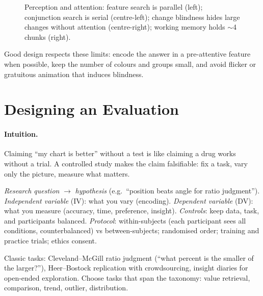 \begin{figure}[h]
\caption{Perception and attention: feature search is parallel (left); conjunction search is serial (centre-left); change blindness hides large changes without attention (centre-right); working memory holds $\sim$4 chunks (right).}
\label{fig:perception-cog}
\end{figure}

Good design respects these limits: encode the answer in a pre-attentive feature when possible, keep the number of colours and groups small, and avoid flicker or gratuitous animation that induces blindness.

\section{Designing an Evaluation}
\label{sec:evaluation-design}
\paragraph{Intuition.} Claiming ``my chart is better'' without a test is like claiming a drug works without a trial. A controlled study makes the claim falsifiable: fix a task, vary only the picture, measure what matters.

\begin{definition}\label{def:study}
\emph{Research question} $\to$ \emph{hypothesis} (e.g.\ ``position beats angle for ratio judgment''). \emph{Independent variable} (IV): what you vary (encoding). \emph{Dependent variable} (DV): what you measure (accuracy, time, preference, insight). \emph{Controls}: keep data, task, and participants balanced. \emph{Protocol}: within-subjects (each participant sees all conditions, counterbalanced) vs between-subjects; randomised order; training and practice trials; ethics consent.
\end{definition}

Classic tasks: Cleveland--McGill ratio judgment (``what percent is the smaller of the larger?''), Heer--Bostock replication with crowdsourcing, insight diaries for open-ended exploration. Choose tasks that span the taxonomy: value retrieval, comparison, trend, outlier, distribution.

